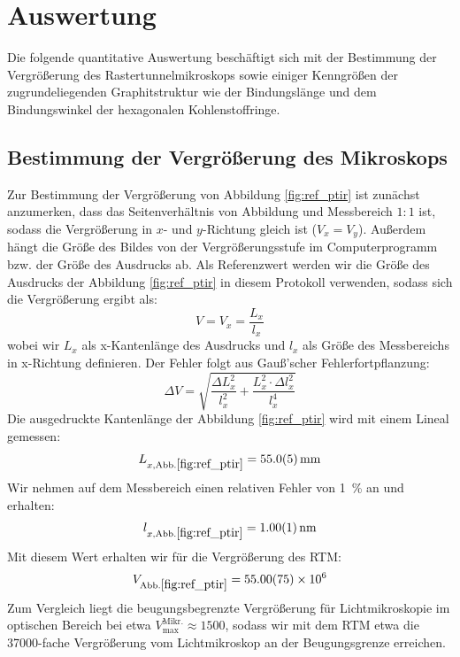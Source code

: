 \documentclass[10pt, a4paper]{article}
\begin{document}
\section{Auswertung}
Die folgende quantitative Auswertung beschäftigt sich mit der Bestimmung der Vergrößerung des Rastertunnelmikroskops sowie einiger Kenngrößen der zugrundeliegenden Graphitstruktur wie der Bindungslänge und dem Bindungswinkel der hexagonalen Kohlenstoffringe.

\subsection{Bestimmung der Vergrößerung des Mikroskops}
Zur Bestimmung der Vergrößerung von Abbildung \ref{fig:ref_ptir} ist zunächst anzumerken, dass das Seitenverhältnis von Abbildung und Messbereich $1:1$ ist, sodass die Vergrößerung in $x$- und $y$-Richtung gleich ist ($V_x = V_y$). Außerdem hängt die Größe des Bildes von der Vergrößerungsstufe im Computerprogramm bzw. der Größe des Ausdrucks ab. Als Referenzwert werden wir die Größe des Ausdrucks der Abbildung \ref{fig:ref_ptir} in diesem Protokoll verwenden, sodass sich die Vergrößerung ergibt als:
\begin{equation}
  V = V_x = \frac{L_x}{l_x}
\end{equation}
wobei wir $L_x$ als x-Kantenlänge des Ausdrucks und $l_x$ als Größe des Messbereichs in x-Richtung definieren.
Der Fehler folgt aus Gauß'scher Fehlerfortpflanzung:
\begin{equation}
  \Delta V = \sqrt{\frac{\Delta L_x ^2}{l_x^2} + \frac{L_x^2 \cdot \Delta l_x^2}{l_x^4}}
\end{equation}
Die ausgedruckte Kantenlänge der Abbildung \ref{fig:ref_ptir} wird mit einem Lineal gemessen:
\begin{equation*}
  L_{x,\mathrm{Abb.\ref{fig:ref_ptir}}} = \SI{55 +- 0,5}{\milli\metre}
\end{equation*}
Wir nehmen auf dem Messbereich einen relativen Fehler von \SI{1}{\percent} an und erhalten:
\begin{align*}
  l_{x,\mathrm{Abb.\ref{fig:ref_ptir}}} = \SI{1,00 +- 0,01}{\nano\metre}
\end{align*}
Mit diesem Wert erhalten wir für die Vergrößerung des RTM:
\begin{align*}
  V_\mathrm{Abb.\ref{fig:ref_ptir}} = \num{55,0 +- 0,75e6}
\end{align*}
Zum Vergleich liegt die beugungsbegrenzte Vergrößerung für Lichtmikroskopie im optischen Bereich bei etwa $V_\mathrm{max}^\mathrm{Mikr.} \approx \num{1500}$, sodass wir mit dem RTM etwa die \num{37000}-fache Vergrößerung vom Lichtmikroskop an der Beugungsgrenze erreichen.
\end{document}
